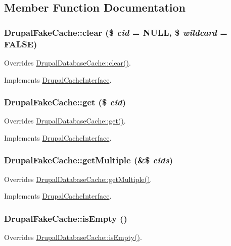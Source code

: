 \subsection{Member Function Documentation}
\hypertarget{classDrupalFakeCache_a524fb90590bc66f8dd8960e6f93de943}{
\subsubsection[{clear}]{\setlength{\rightskip}{0pt plus 5cm}DrupalFakeCache::clear (\$ {\em cid} = {\ttfamily NULL}, \/  \$ {\em wildcard} = {\ttfamily FALSE})}}
\label{classDrupalFakeCache_a524fb90590bc66f8dd8960e6f93de943}
Overrides \hyperlink{classDrupalDatabaseCache_a07b7a236787af4e11615f26dd98f51f7}{DrupalDatabaseCache::clear()}. 

Implements \hyperlink{interfaceDrupalCacheInterface_a5c8e341f653337185feff4ddc30c1b48}{DrupalCacheInterface}.\hypertarget{classDrupalFakeCache_aaab8fb6e1a78691e81e0f3d48d4edbad}{
\subsubsection[{get}]{\setlength{\rightskip}{0pt plus 5cm}DrupalFakeCache::get (\$ {\em cid})}}
\label{classDrupalFakeCache_aaab8fb6e1a78691e81e0f3d48d4edbad}
Overrides \hyperlink{classDrupalDatabaseCache_a66a573f6f3e13198b1e95fdc4bd14f8e}{DrupalDatabaseCache::get()}. 

Implements \hyperlink{interfaceDrupalCacheInterface_ad5e2988b3cb4633f473ebf0f889d088f}{DrupalCacheInterface}.\hypertarget{classDrupalFakeCache_a9ca8ecb251e83f3d30beb2f6722ef746}{
\subsubsection[{getMultiple}]{\setlength{\rightskip}{0pt plus 5cm}DrupalFakeCache::getMultiple (\&\$ {\em cids})}}
\label{classDrupalFakeCache_a9ca8ecb251e83f3d30beb2f6722ef746}
Overrides \hyperlink{classDrupalDatabaseCache_ad9f421906b15c039f1842cf8c14e8768}{DrupalDatabaseCache::getMultiple()}. 

Implements \hyperlink{interfaceDrupalCacheInterface_aee8c869921fff61654d12099237763dc}{DrupalCacheInterface}.\hypertarget{classDrupalFakeCache_a78bf2c373a0204a24bd809c0f27e7a4e}{
\subsubsection[{isEmpty}]{\setlength{\rightskip}{0pt plus 5cm}DrupalFakeCache::isEmpty ()}}
\label{classDrupalFakeCache_a78bf2c373a0204a24bd809c0f27e7a4e}
Overrides \hyperlink{classDrupalDatabaseCache_addc129b38e3ffdda5a55f2f453ea5619}{DrupalDatabaseCache::isEmpty()}. 

